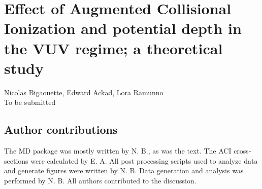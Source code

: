 
\newcommand{\PaperTitleHundrednm}{Effect of Augmented Collisional Ionization and potential depth in the VUV regime; a theoretical study}

\section{\PaperTitleHundrednm}
\label{section:papers:100nm}

\begin{flushright}
Nicolas Bigaouette, Edward Ackad, Lora Ramunno\\
To be submitted
\end{flushright}

\HidePDFAbstractNumber

\subsection{Author contributions}
The MD package was mostly written by N. B., as was the text. The ACI cross-sections were calculated
by E. A. All post processing scripts used to analyze data and generate figures
were written by N. B. Data generation and analysis was performed by N. B.
All authors contributed to the discussion.




